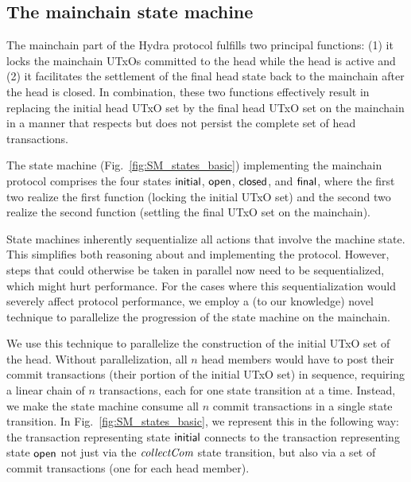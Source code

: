 \subsection{The mainchain state machine}
\label{sec:overview_mc}

The mainchain part of the Hydra protocol fulfills two principal
functions: (1) it locks the mainchain UTxOs committed %
to the head while the head is active and (2) it facilitates the
settlement of the final head state back to the mainchain after the
head is closed. In combination, these two functions effectively result
in replacing the initial head UTxO set by the final head UTxO set on
the mainchain in a manner that respects but does not persist the
complete set of head transactions.



The state machine (Fig.~\ref{fig:SM_states_basic}) implementing
the mainchain protocol comprises the four states $\mathsf{initial}$,
$\mathsf{open}$, $\mathsf{closed}$, and $\mathsf{final}$, where the first two realize
the first function (locking the initial UTxO set) and the
second two realize the second function (settling the final UTxO set on
the mainchain).

State machines inherently sequentialize all actions that involve the
machine state. This simplifies both reasoning about and implementing
the protocol.
%
However, steps that could otherwise be taken in parallel now need to be
sequentialized, which might hurt performance. For the cases where this
sequentialization would severely affect protocol performance,
we employ a (to our knowledge) novel
technique to parallelize the progression of the state machine on the
mainchain.
%

We use this technique %
to parallelize the construction of the initial UTxO set of the head.
Without parallelization, all $n$ head members would have
to post their commit transactions (their portion of the
initial UTxO set) in sequence, requiring a linear chain of $n$
transactions, %
each for one state transition at a time.
Instead, we make the state machine consume all $n$ commit transactions
in a single state transition. In Fig.~\ref{fig:SM_states_basic}, we
represent this in the following way:
the transaction representing state $\mathsf{initial}$ connects
to the transaction representing state $\mathsf{open}$ not just via the
$\textit{collectCom}$ state transition, but also via a set of commit transactions
(one for each head member).


